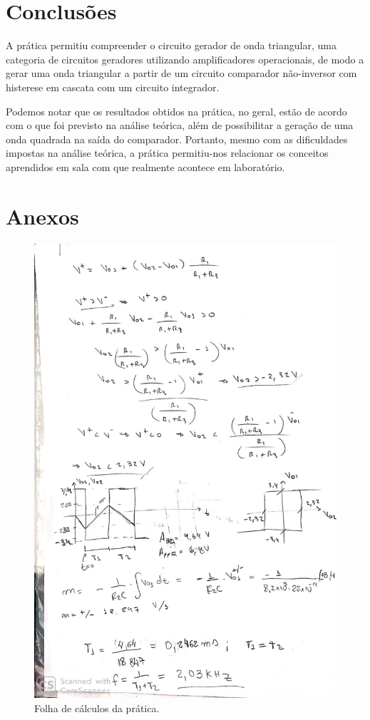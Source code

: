\section{Conclusões}

A prática permitiu compreender o circuito gerador de onda triangular, uma categoria de circuitos geradores utilizando amplificadores operacionais, de modo a gerar uma onda triangular a partir de um circuito comparador não-inversor com histerese em cascata com um circuito integrador.

Podemos notar que os resultados obtidos na prática, no geral, estão de acordo com o que foi previsto na análise teórica, além de possibilitar a geração de uma onda quadrada na saída do comparador. Portanto, mesmo com as dificuldades impostas na análise teórica, a prática  permitiu-nos relacionar os conceitos aprendidos em sala com que realmente acontece em laboratório.


\section{Anexos}

\begin{figure}[H] 
\includegraphics[scale=0.4]{images/calc.jpeg} 
\centering
\caption{Folha de cálculos da prática.}
\label{p5-2} 
\end{figure} 
